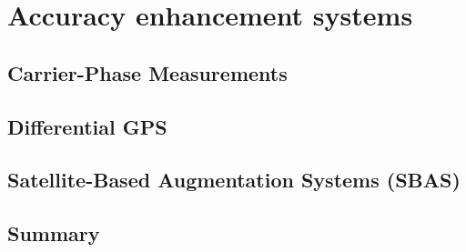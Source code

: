 \chapter{Accuracy enhancement systems}

\section{Carrier-Phase Measurements}

\section{Differential GPS}

\section{Satellite-Based Augmentation Systems (SBAS)}

\section{Summary}